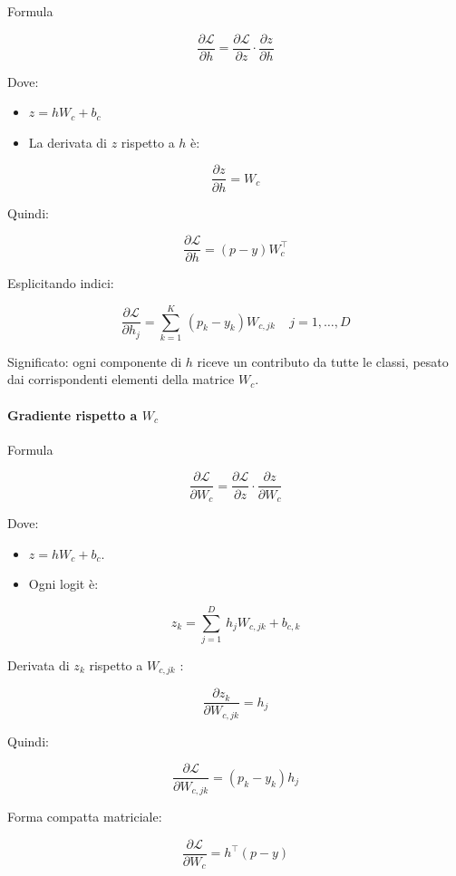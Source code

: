 \documentclass[
  11pt,
]{article}
\begin{document}
Formula

\[\frac{\partial\mathcal{L}}{\partial h} = \frac{\partial\mathcal{L}}{\partial z} \cdot \frac{\partial z}{\partial h}\]

Dove:


\begin{itemize}
\item
  \(z = hW_{c} + b_{c}\)
\item
  La derivata di \(z\) rispetto a \(h\) è:
\end{itemize}


\[\frac{\partial z}{\partial h} = W_{c}\]


Quindi:


\[\frac{\partial\mathcal{L}}{\partial h} = (p - y)W_{c}^{\top}\]


Esplicitando indici:


\[\frac{\partial\mathcal{L}}{\partial h_{j}} = \sum_{k = 1}^{K}\,\left( p_{k} - y_{k} \right)W_{c,jk}\ \ \ \ \ j = 1,\ldots,D\]

Significato: ogni componente di \(h\) riceve un contributo da tutte le
classi, pesato dai corrispondenti elementi della matrice \(W_{c}\).


\paragraph{Gradiente rispetto a $W_c$}


Formula

\[\frac{\partial\mathcal{L}}{\partial W_{c}} = \frac{\partial\mathcal{L}}{\partial z} \cdot \frac{\partial z}{\partial W_{c}}\]

Dove:


\begin{itemize}
\item
  \(z = hW_{c} + b_{c}\).
\item
  Ogni logit è:
\end{itemize}


\[z_{k} = \sum_{j = 1}^{D}\, h_{j}W_{c,jk} + b_{c,k}\]


Derivata di \(z_{k}\) rispetto a \(W_{c,jk}\) :


\[\frac{\partial z_{k}}{\partial W_{c,jk}} = h_{j}\]


Quindi:


\[\frac{\partial\mathcal{L}}{\partial W_{c,jk}} = \left( p_{k} - y_{k} \right)h_{j}\]


Forma compatta matriciale:


\[\frac{\partial\mathcal{L}}{\partial W_{c}} = h^{\top}(p - y)\]
\end{document}
